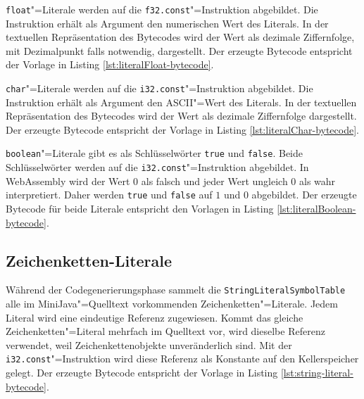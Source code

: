 \lstinline{float}"=Literale werden auf die \lstinline{f32.const}"=Instruktion abgebildet. Die Instruktion erhält als Argument den numerischen Wert des Literals. In der textuellen Repräsentation des Bytecodes wird der Wert als dezimale Ziffernfolge, mit Dezimalpunkt falls notwendig, dargestellt. Der erzeugte Bytecode entspricht der Vorlage in Listing \ref{lst:literalFloat-bytecode}.



\lstinline{char}"=Literale werden auf die \lstinline{i32.const}"=Instruktion abgebildet. Die Instruktion erhält als Argument den ASCII"=Wert des Literals. In der textuellen Repräsentation des Bytecodes wird der Wert als dezimale Ziffernfolge dargestellt. Der erzeugte Bytecode entspricht der Vorlage in Listing \ref{lst:literalChar-bytecode}.



\pagebreak
\lstinline{boolean}"=Literale gibt es als Schlüsselwörter \lstinline{true} und \lstinline{false}. Beide Schlüsselwörter werden auf die \lstinline{i32.const}"=Instruktion abgebildet. In WebAssembly wird der Wert $0$ als falsch und jeder Wert ungleich $0$ als wahr interpretiert. Daher werden \lstinline{true} und \lstinline{false} auf $1$ und $0$ abgebildet. Der erzeugte Bytecode für beide Literale entspricht den Vorlagen in Listing \ref{lst:literalBoolean-bytecode}.



\subsection{Zeichenketten-Literale}
\label{subsec:Zeichenketten-Literale}

Während der Codegenerierungsphase sammelt die \lstinline{StringLiteralSymbolTable} alle im MiniJava"=Quelltext vorkommenden Zeichenketten"=Literale. Jedem Literal wird eine eindeutige Referenz zugewiesen. Kommt das gleiche Zeichenketten"=Literal mehrfach im Quelltext vor, wird dieselbe Referenz verwendet, weil Zeichenkettenobjekte unveränderlich sind. Mit der \lstinline{i32.const}"=Instruktion wird diese Referenz als Konstante auf den Kellerspeicher gelegt. Der erzeugte Bytecode entspricht der Vorlage in Listing \ref{lst:string-literal-bytecode}.

